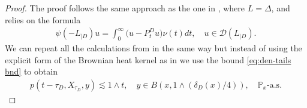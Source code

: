 \documentclass[12pt,a4paper,onecolumn]{article}
\theoremstyle{definition}
\newcommand{\p}{\mathds{P}}
\newcommand{\1}{\mathbf 1}
\newcommand{\de}{\delta_D}
\newcommand{\DD}{\mathcal{D}}
\newcommand{\Lbase}{L_{|D}}
\newcommand{\Lo}{\psi(-L_{|D})}
\numberwithin{equation}{section}
\begin{document}
	\begin{proof}
		The proof follows the same approach as the one in \cite[Lemma 2.4]{Bio23cpaa}, where $L=\Delta$, and relies on the formula 
        \begin{align*}
            \Lo u = \int_0^\infty\big(  u-P_t^D u\big)\nu(t)dt,\quad u\in \DD(\Lbase).
        \end{align*}
        We can repeat all the calculations from \cite{Bio23cpaa} in the same way but instead of using the explicit form of the Brownian heat kernel as in \cite[Eq. (2.32)]{Bio23cpaa} we use the bound \eqref{eq:den-tails bnd} to obtain
		\begin{align*}
			p(t-\tau_D,X_{\tau_D},y)\lesssim 1\wedge t,\quad y\in B(x,1\wedge (\de(x)/4)), \quad \text{$\p_x$-a.s.}
		\end{align*}
	\end{proof}
\end{document}
